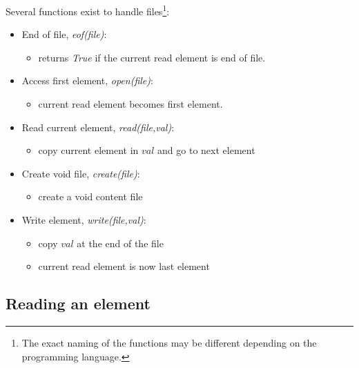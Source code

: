 \documentclass{beamer}[10pt, usepdftitle=false, handout]
\begin{document}
	\begin{frame}
		
	Several functions exist to handle files\footnote{The exact naming of the functions may be different depending on the programming language.}:
	
	\begin{itemize}	
	\item {End of file, \textit{eof(file)}: 
		\begin{itemize}
			\item {	returns \textit{True} if the current read element is end of file.}
		\end{itemize}}
	\item {Access first element, \textit{open(file)}:
		\begin{itemize}
			\item{current read element becomes first element.}
		\end{itemize} }
	\item {Read current element, \textit{read(file,val)}: 
		\begin{itemize}
			\item{copy current element in $val$ and go to next element}
		\end{itemize} }
	\item {Create void file, \textit{create(file)}: 
		\begin{itemize}
			\item {create a void content file}
		\end{itemize} }
	\item {Write element, \textit{write(file,val)}:
		\begin{itemize}
			\item {copy $val$ at the end of the file}
			\item {current read element is now last element}		
		\end{itemize}				
	}	
	\end{itemize}		
	  	
	\end{frame}		
		
	\subsection{Reading an element}
	
\end{document}
